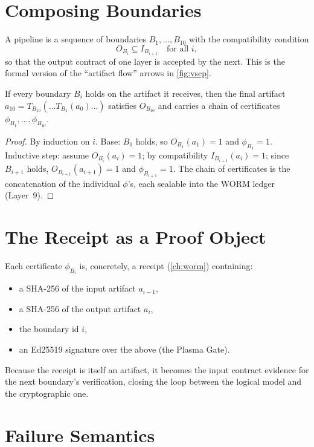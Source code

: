 \section{Composing Boundaries}
\label{sec:formal-compose}

A pipeline is a sequence of boundaries $B_1,\dots,B_{10}$ with the
compatibility condition
\[
O_{B_i} \subseteq I_{B_{i+1}} \quad\text{for all } i,
\]
so that the output contract of one layer is accepted by the next. This is the
formal version of the ``artifact flow'' arrows in \cref{fig:vscp}.

\begin{theorem}
If every boundary $B_i$ holds on the artifact it receives, then the final
artifact $a_{10} = T_{B_{10}}(\dots T_{B_1}(a_0)\dots)$ satisfies
$O_{B_{10}}$ and carries a chain of certificates
$\phi_{B_1},\dots,\phi_{B_{10}}$.
\end{theorem}
\begin{proof}
By induction on $i$. Base: $B_1$ holds, so $O_{B_1}(a_1)=1$ and
$\phi_{B_1}=1$. Inductive step: assume $O_{B_i}(a_i)=1$; by compatibility
$I_{B_{i+1}}(a_i)=1$; since $B_{i+1}$ holds,
$O_{B_{i+1}}(a_{i+1})=1$ and $\phi_{B_{i+1}}=1$. The chain of certificates
is the concatenation of the individual $\phi$'s, each sealable into the WORM
ledger (Layer~9).
\end{proof}

\section{The Receipt as a Proof Object}
\label{sec:formal-receipt}

Each certificate $\phi_{B_i}$ is, concretely, a receipt
(\cref{ch:worm}) containing:
\begin{itemize}
  \item a SHA-256 of the input artifact $a_{i-1}$,
  \item a SHA-256 of the output artifact $a_i$,
  \item the boundary id $i$,
  \item an Ed25519 signature over the above (the Plasma Gate).
\end{itemize}
Because the receipt is itself an artifact, it becomes the input contract
evidence for the next boundary's verification, closing the loop between the
logical model and the cryptographic one.

\section{Failure Semantics}
\label{sec:formal-fail}

